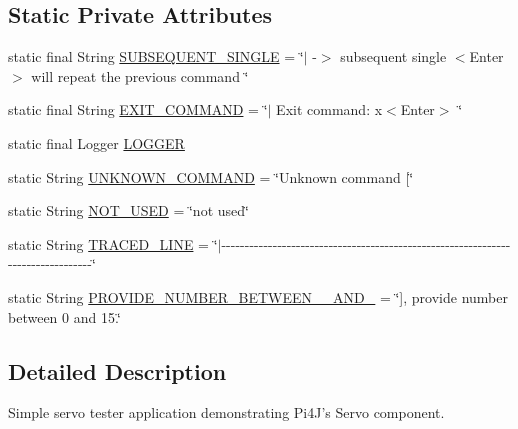 \subsection*{Static Private Attributes}
\begin{DoxyCompactItemize}
\item 
static final String \hyperlink{classcom_1_1pi4j_1_1examples_1_1PCA9685GpioServoExample_a7875cd4be641770d92f2658ce5c8c80f}{S\+U\+B\+S\+E\+Q\+U\+E\+N\+T\+\_\+\+S\+I\+N\+G\+L\+E} = \char`\"{}$\vert$ -\/$>$ subsequent single $<$Enter$>$ will repeat the previous command \char`\"{}
\item 
static final String \hyperlink{classcom_1_1pi4j_1_1examples_1_1PCA9685GpioServoExample_a3af0003c6c490dfbb20dcea768da6fd8}{E\+X\+I\+T\+\_\+\+C\+O\+M\+M\+A\+N\+D} = \char`\"{}$\vert$ Exit command\+: x$<$Enter$>$ \char`\"{}
\item 
static final Logger \hyperlink{classcom_1_1pi4j_1_1examples_1_1PCA9685GpioServoExample_a99e52636e6c3f364d88a01dfe7bdf645}{L\+O\+G\+G\+E\+R}
\item 
static String \hyperlink{classcom_1_1pi4j_1_1examples_1_1PCA9685GpioServoExample_a5872e3a5afc895f8265fa55f6fa628e1}{U\+N\+K\+N\+O\+W\+N\+\_\+\+C\+O\+M\+M\+A\+N\+D} = \char`\"{}Unknown command \mbox{[}\char`\"{}
\item 
static String \hyperlink{classcom_1_1pi4j_1_1examples_1_1PCA9685GpioServoExample_a4a1a1ba14c4378e154d2d15c35757b49}{N\+O\+T\+\_\+\+U\+S\+E\+D} = \char`\"{}not used\char`\"{}
\item 
static String \hyperlink{classcom_1_1pi4j_1_1examples_1_1PCA9685GpioServoExample_a6ff12704305b8c1c5109be29bf994e4b}{T\+R\+A\+C\+E\+D\+\_\+\+L\+I\+N\+E} = \char`\"{}$\vert$-\/-\/-\/-\/-\/-\/-\/-\/-\/-\/-\/-\/-\/-\/-\/-\/-\/-\/-\/-\/-\/-\/-\/-\/-\/-\/-\/-\/-\/-\/-\/-\/-\/-\/-\/-\/-\/-\/-\/-\/-\/-\/-\/-\/-\/-\/-\/-\/-\/-\/-\/-\/-\/-\/-\/-\/-\/-\/-\/-\/-\/-\/-\/-\/-\/-\/-\/-\/-\/-\/-\/-\/-\/-\/-\/-\/-\/-\/-\/-\/\char`\"{}
\item 
static String \hyperlink{classcom_1_1pi4j_1_1examples_1_1PCA9685GpioServoExample_aa18e2ce8b60b7d8ce9423a588d5be754}{P\+R\+O\+V\+I\+D\+E\+\_\+\+N\+U\+M\+B\+E\+R\+\_\+\+B\+E\+T\+W\+E\+E\+N\+\_\+\_\+\+A\+N\+D\+\_} = \char`\"{}\mbox{]}, provide number between 0 and 15.\char`\"{}
\end{DoxyCompactItemize}


\subsection{Detailed Description}
Simple servo tester application demonstrating Pi4\+J's Servo component.

